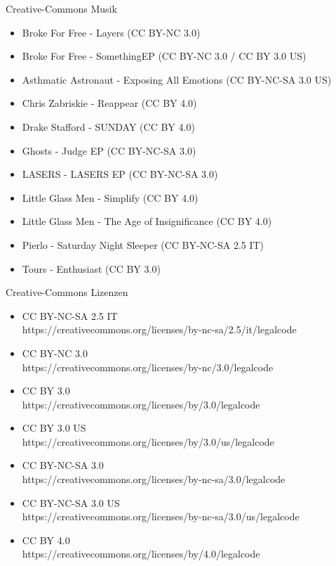 \begin{frame}{Creative-Commons Musik}
	\scriptsize {
		\begin{itemize}
			\item Broke For Free - Layers (CC BY-NC 3.0)
			\item Broke For Free - SomethingEP (CC BY-NC 3.0 / CC BY 3.0 US)
			\item Asthmatic Astronaut - Exposing All Emotions (CC BY-NC-SA 3.0 US)
			\item Chris Zabriskie - Reappear (CC BY 4.0)
			\item Drake Stafford - SUNDAY (CC BY 4.0)
			\item Ghosts - Judge EP (CC BY-NC-SA 3.0)
			\item LASERS - LASERS EP (CC BY-NC-SA 3.0)
			\item Little Glass Men - Simplify (CC BY 4.0)
			\item Little Glass Men - The Age of Insignificance (CC BY 4.0)
			\item Pierlo - Saturday Night Sleeper (CC BY-NC-SA 2.5 IT)
			\item Tours - Enthusiast (CC BY 3.0)
		\end{itemize}
	}
\end{frame}

\begin{frame}{Creative-Commons Lizenzen}
	\scriptsize {
		\begin{itemize}
			\item CC BY-NC-SA 2.5 IT\\ https://creativecommons.org/licenses/by-nc-sa/2.5/it/legalcode
			
			\item CC BY-NC 3.0\\
			https://creativecommons.org/licenses/by-nc/3.0/legalcode
			
			\item CC BY 3.0\\
			https://creativecommons.org/licenses/by/3.0/legalcode
			
			\item CC BY 3.0 US\\
			https://creativecommons.org/licenses/by/3.0/us/legalcode
			
			\item CC BY-NC-SA 3.0\\
			https://creativecommons.org/licenses/by-nc-sa/3.0/legalcode
			
			\item CC BY-NC-SA 3.0 US\\
			https://creativecommons.org/licenses/by-nc-sa/3.0/us/legalcode
			
			\item CC BY 4.0\\
			https://creativecommons.org/licenses/by/4.0/legalcode
	\end{itemize}
	}
\end{frame}

